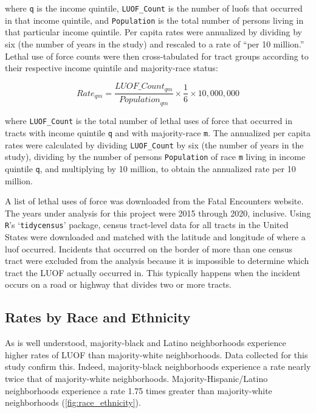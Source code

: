 \documentclass[12pt]{article}
\begin{document}
\noindent{}where \texttt{q} is the income quintile, \texttt{LUOF\_Count} is the number of \acrshort{luof}s that occurred in that income quintile, and \texttt{Population} is the total number of persons living in that particular income quintile. Per capita rates were annualized by dividing by six (the number of years in the study) and rescaled to a rate of “per 10 million.” Lethal use of force counts were then cross-tabulated for tract groups according to their respective income quintile and majority-race status:

\begin{equation}
{Rate}_{qm}=\frac{{LUOF\_Count}_{qm}}{{Population}_{qm}}\times\frac{1}{6}\times10,000,000
\label{eq:quintile_majority_rate}
\end{equation}

\noindent{}where \texttt{LUOF\_Count} is the total number of lethal uses of force that occurred in tracts with income quintile \texttt{q} and with majority-race \texttt{m}. The annualized per capita rates were calculated by dividing \texttt{LUOF\_Count} by six (the number of years in the study), dividing by the number of persons \texttt{Population} of race \texttt{m} living in income quintile \texttt{q}, and multiplying by 10 million, to obtain the annualized rate per 10 million.

A list of lethal uses of force was downloaded from the Fatal Encounters website. The years under analysis for this project were 2015 through 2020, inclusive. Using \texttt{R}’s ‘\texttt{tidycensus}’ package, census tract-level data for all tracts in the United States were downloaded and matched with the latitude and longitude of where a \gls{luof} occurred. Incidents that occurred on the border of more than one census tract were excluded from the analysis because it is impossible to determine which tract the LUOF actually occurred in. This typically happens when the incident occurs on a road or highway that divides two or more tracts.

\subsection{Rates by Race and Ethnicity}

As is well understood, majority-black and Latino neighborhoods experience higher rates of LUOF than majority-white neighborhoods. Data collected for this study confirm this. Indeed, majority-black neighborhoods experience a rate nearly twice that of majority-white neighborhoods. Majority-Hispanic/Latino neighborhoods experience a rate 1.75 times greater than majority-white neighborhoods (\autoref{fig:race_ethnicity}).
\end{document}
